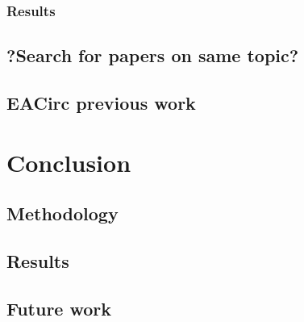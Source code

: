 \documentclass[
  print, %
  Table,   %
  nolof,     %
  nolot,     %
  11pt, %
  oneside  %
]{fithesis3}
\begin{document}
\subsection{Results}
\section{?Search for papers on same topic?}
\section{EACirc previous work}

\chapter{Conclusion}

\section{Methodology}
\section{Results}
\section{Future work}
\end{document}
